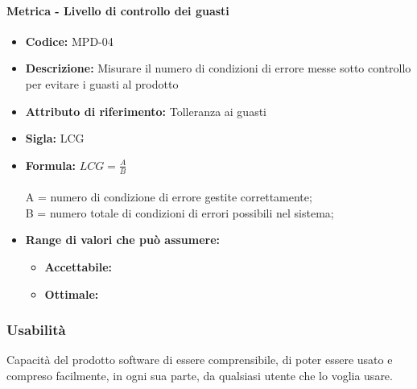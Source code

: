                   \paragraph{Metrica - Livello di controllo dei guasti}
                     \begin{itemize}
        \item    \textbf{Codice:} MPD-04
        \item    \textbf{Descrizione:} Misurare il numero di condizioni di errore messe sotto controllo per evitare i guasti al prodotto
         \item   \textbf{Attributo di riferimento:} Tolleranza ai guasti
       \item     \textbf{Sigla:} LCG
       \item     \textbf{Formula:} \begin{math} LCG = \frac{A}{B}\end{math}\\ \\
             A = numero di condizione di errore gestite correttamente;\\
              B = numero totale di condizioni di errori possibili nel sistema;
                \item \textbf{Range di valori che può assumere:}
        \begin{itemize}
            \item \textbf{Accettabile:} 
            \item \textbf{Ottimale:} 
        \end{itemize}
       \end{itemize}
              
           
\subsubsection{Usabilità} 
Capacità del prodotto software di essere comprensibile, di poter essere usato e compreso facilmente, in ogni sua parte, da qualsiasi utente che lo voglia usare. \\


